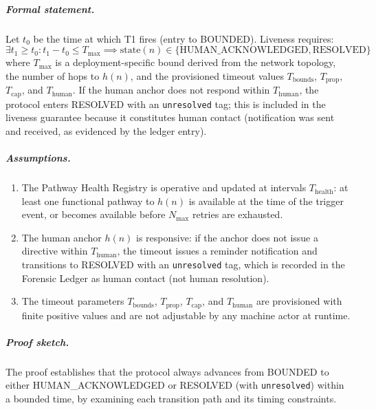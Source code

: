 \subparagraph{Formal statement.} Let $t_0$ be the time at which T1 fires (entry to BOUNDED). Liveness requires:
\begin{equation}
\exists t_1 \geq t_0 : t_1 - t_0 \leq T_{\max} \implies \text{state}(n) \in \{\text{HUMAN\_ACKNOWLEDGED}, \text{RESOLVED}\}
\end{equation}
where $T_{\max}$ is a deployment-specific bound derived from the network topology, the number of hops to $h(n)$, and the provisioned timeout values $T_{\text{bounds}}$, $T_{\text{prop}}$, $T_{\text{cap}}$, and $T_{\text{human}}$. If the human anchor does not respond within $T_{\text{human}}$, the protocol enters RESOLVED with an \texttt{unresolved} tag; this is included in the liveness guarantee because it constitutes human contact (notification was sent and received, as evidenced by the ledger entry).

\subparagraph{Assumptions.}
\begin{enumerate}
\item[\textbf{A2.1}] The Pathway Health Registry is operative and updated at intervals $T_{\text{health}}$: at least one functional pathway to $h(n)$ is available at the time of the trigger event, or becomes available before $N_{\max}$ retries are exhausted.
\item[\textbf{A2.2}] The human anchor $h(n)$ is responsive: if the anchor does not issue a directive within $T_{\text{human}}$, the timeout issues a reminder notification and transitions to RESOLVED with an \texttt{unresolved} tag, which is recorded in the Forensic Ledger as human contact (not human resolution).
\item[\textbf{A2.3}] The timeout parameters $T_{\text{bounds}}$, $T_{\text{prop}}$, $T_{\text{cap}}$, and $T_{\text{human}}$ are provisioned with finite positive values and are not adjustable by any machine actor at runtime.
\end{enumerate}

\subparagraph{Proof sketch.} The proof establishes that the protocol always advances from BOUNDED to either HUMAN\_ACKNOWLEDGED or RESOLVED (with \texttt{unresolved}) within a bounded time, by examining each transition path and its timing constraints.

